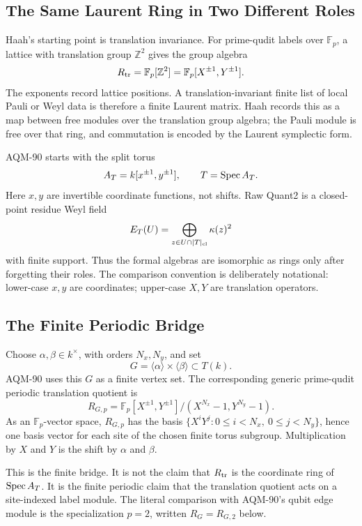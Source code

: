 \subsection{The Same Laurent Ring in Two Different Roles}

Haah's starting point is translation invariance.  For prime-qudit labels over
\(\mathbb F_p\), a lattice with translation group \(\mathbb Z^2\) gives the
group algebra
\[
  R_{\rm tr}=\mathbb F_p[\mathbb Z^2]
  =\mathbb F_p[X^{\pm1},Y^{\pm1}].
\]
The exponents record lattice positions.  A translation-invariant finite list
of local Pauli or Weyl data is therefore a finite Laurent matrix.  Haah records
this as a map between free modules over the translation group algebra; the
Pauli module is free over that ring, and commutation is encoded by the
Laurent symplectic form.

AQM-90 starts with the split torus
\[
  A_T=k[x^{\pm1},y^{\pm1}],\qquad T=\operatorname{Spec} A_T.
\]
Here \(x,y\) are invertible coordinate functions, not shifts.  Raw Quant2 is a
closed-point residue Weyl field
\[
  E_T(U)=\bigoplus_{z\in U\cap |T|_{\rm cl}}\kappa(z)^2
\]
with finite support.  Thus the formal algebras are isomorphic as rings only
after forgetting their roles.  The comparison convention is deliberately
notational: lower-case \(x,y\) are coordinates; upper-case \(X,Y\) are
translation operators.

\subsection{The Finite Periodic Bridge}

Choose \(\alpha,\beta\in k^\times\), with orders \(N_x,N_y\), and set
\[
  G=\langle\alpha\rangle\times\langle\beta\rangle\subset T(k).
\]
AQM-90 uses this \(G\) as a finite vertex set.  The corresponding generic
prime-qudit periodic translation quotient is
\[
  R_{G,p}=
  \mathbb F_p[X^{\pm1},Y^{\pm1}]/(X^{N_x}-1,Y^{N_y}-1).
\]
As an \(\mathbb F_p\)-vector space, \(R_{G,p}\) has the basis
\(\{X^iY^j:0\le i<N_x,\ 0\le j<N_y\}\), hence one basis vector for each site of
the chosen finite torus subgroup.  Multiplication by \(X\) and \(Y\) is the
shift by \(\alpha\) and \(\beta\).

This is the finite bridge.  It is not the claim that \(R_{\rm tr}\) is the
coordinate ring of \(\operatorname{Spec} A_T\).  It is the finite periodic claim that the
translation quotient acts on a site-indexed label module.  The literal
comparison with AQM-90's qubit edge module is the specialization \(p=2\),
written \(R_G=R_{G,2}\) below.

